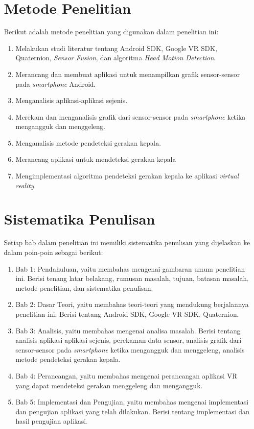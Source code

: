 \section{Metode Penelitian}

Berikut adalah metode penelitian yang digunakan dalam penelitian ini:
	\begin{enumerate}
		\item Melakukan studi literatur tentang Android SDK, Google VR SDK, Quaternion, \textit{Sensor Fusion}, dan algoritma \textit{Head Motion Detection}.
		\item Merancang dan membuat aplikasi untuk menampilkan grafik sensor-sensor pada \textit{smartphone} Android.
		\item Menganalisis aplikasi-aplikasi sejenis.
		\item Merekam dan menganalisis grafik dari sensor-sensor pada \textit{smartphone} ketika mengangguk dan menggeleng.
		\item Menganalisis metode pendeteksi gerakan kepala.
		\item Merancang aplikasi untuk mendeteksi gerakan kepala
		\item Mengimplementasi algoritma pendeteksi gerakan kepala ke aplikasi \textit{virtual reality}.
	\end{enumerate}
\section{Sistematika Penulisan}

Setiap bab dalam penelitian ini memiliki sistematika penulisan yang dijelaskan ke dalam poin-poin sebagai berikut:
\begin{enumerate}
	\item Bab 1: Pendahuluan, yaitu membahas mengenai gambaran umum penelitian ini. Berisi tenang latar belakang, rumusan masalah, tujuan, batasan masalah, metode penelitian, dan sistematika penulisan.
	\item Bab 2: Dasar Teori, yaitu membahas teori-teori yang mendukung berjalannya penelitian ini. Berisi tentang Android SDK, Google VR SDK, Quaternion.
	\item Bab 3: Analisis, yaitu membahas mengenai analisa masalah. Berisi tentang analisis aplikasi-aplikasi sejenis, perekaman data sensor, analisis grafik dari sensor-sensor pada \textit{smartphone} ketika mengangguk dan menggeleng, analisis metode pendeteksi gerakan kepala. 
	\item Bab 4: Perancangan, yaitu membahas mengenai perancangan aplikasi VR yang dapat mendeteksi gerakan menggeleng dan mengangguk.
	\item Bab 5: Implementasi dan Pengujian, yaitu membahas mengenai implementasi dan pengujian aplikasi yang telah dilakukan. Berisi tentang implementasi dan hasil pengujian aplikasi.
\end{enumerate}
